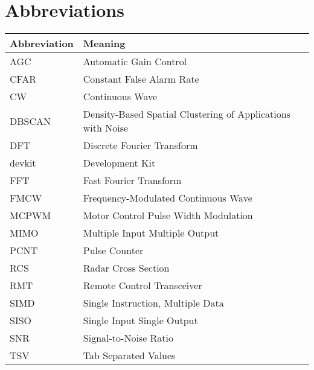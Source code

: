 
\chapter*{Abbreviations}


\begin{center}
  \begin{tabular}{| m{4cm}| m{9cm} | }
    \hline
    \textbf{Abbreviation} & \textbf{Meaning}                                            \\
    \hline
    \hline
    AGC                   & Automatic Gain Control                                      \\
    CFAR                  & Constant False Alarm Rate                                   \\
    CW                    & Continuous Wave                                             \\
    DBSCAN                & Density-Based Spatial Clustering of Applications with Noise \\
    DFT                   & Discrete Fourier Transform                                  \\
    devkit                & Development Kit                                             \\
    FFT                   & Fast Fourier Transform                                      \\
    FMCW                  & Frequency-Modulated Continuous Wave                         \\
    MCPWM                 & Motor Control Pulse Width Modulation                        \\
    MIMO                  & Multiple Input Multiple Output                              \\
    PCNT                  & Pulse Counter                                               \\
    RCS                   & Radar Cross Section                                         \\
    RMT                   & Remote Control Transceiver                                  \\
    SIMD                  & Single Instruction, Multiple Data                           \\
    SISO                  & Single Input Single Output                                  \\
    SNR                   & Signal-to-Noise Ratio                                       \\
    TSV                   & Tab Separated Values                                        \\
    \hline
  \end{tabular}

\end{center}
